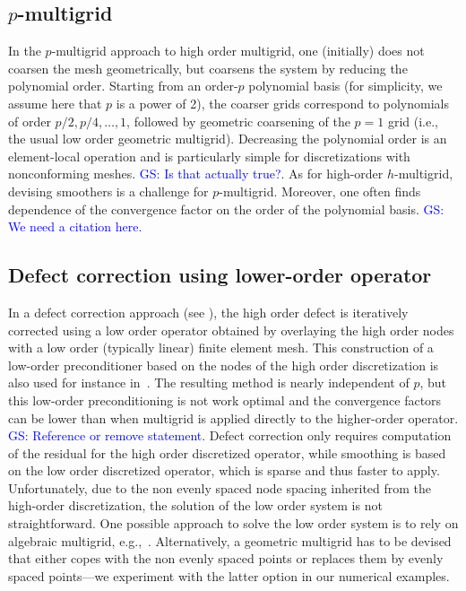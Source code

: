 \documentclass[smallcondensed,final]{svjour3}     %
\newcommand{\gsnote}[1]{\textcolor{blue}{GS: #1}}
\begin{document}
\subsection{$p$-multigrid}\label{subsec:p}
In the $p$-multigrid approach to high order multigrid, one (initially)
does not coarsen the mesh geometrically, but coarsens the system by
reducing the polynomial order. Starting from an order-$p$ polynomial
basis (for simplicity, we assume here that $p$ is a power of 2), the
coarser grids correspond to polynomials of order $p/2, p/4,\ldots,1$,
followed by geometric coarsening of the $p=1$ grid (i.e., the usual
low order geometric multigrid). Decreasing the polynomial order is an
element-local operation and is particularly simple for discretizations
with nonconforming meshes. \gsnote{Is that actually true?}. As for
high-order $h$-multigrid, devising smoothers is a challenge for
$p$-multigrid.  Moreover, one often finds dependence of the
convergence factor on the order of the polynomial basis. \gsnote{We
  need a citation here.}

\subsection{Defect correction using lower-order operator}\label{subsec:low}
In a defect correction approach (see
\cite{TrottenbergOosterleeSchuller01}), the high order defect is
iteratively corrected using a low order operator obtained by
overlaying the high order nodes with a low order (typically linear)
finite element mesh.  This construction of a low-order preconditioner
based on the nodes of the high order discretization is also used for
instance
in~\cite{Brown10,Kim07,DevilleMund90,HeysManteuffelMcCormickEtAl05}.
The resulting method is nearly independent of $p$, but this low-order
preconditioning is not work optimal and the convergence factors can be
lower than when multigrid is applied directly to the higher-order
operator. \gsnote{Reference or remove statement.} Defect correction
only requires computation of the residual for the high order
discretized operator, while smoothing is based on the low order
discretized operator, which is sparse and thus faster to apply.
%
Unfortunately, due to the non evenly spaced node spacing inherited
from the high-order discretization, the solution of the low order
system is not straightforward. One possible approach to solve the low
order system is to rely on algebraic multigrid,
e.g.,~\cite{Brown10,HeysManteuffelMcCormickEtAl05}. Alternatively, a
geometric multigrid has to be devised that either copes with the non
evenly spaced points or replaces them by evenly spaced points---we
experiment with the latter option in our numerical examples.
\end{document}
